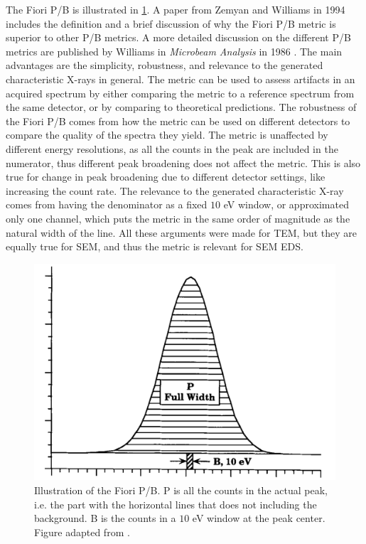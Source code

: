 The Fiori P/B is illustrated in \cref{fig:fiori_pb}.
A paper from Zemyan and Williams in 1994 \cite{zemyan_standard_performance_1994} includes the definition and a brief discussion of why the Fiori P/B metric is superior to other P/B metrics.
A more detailed discussion on the different P/B metrics are published by Williams in \emph{Microbeam Analysis} in 1986 \cite{williams_standard_definitions_1986}.
The main advantages are the simplicity, robustness, and relevance to the generated characteristic X-rays in general.
The metric can be used to assess artifacts in an acquired spectrum by either comparing the metric to a reference spectrum from the same detector, or by comparing to theoretical predictions.
The robustness of the Fiori P/B comes from how the metric can be used on different detectors to compare the quality of the spectra they yield.
The metric is unaffected by different energy resolutions, as all the counts in the peak are included in the numerator, thus different peak broadening does not affect the metric.
This is also true for change in peak broadening due to different detector settings, like increasing the count rate.
The relevance to the generated characteristic X-ray comes from having the denominator as a fixed $10$ eV window, or approximated only one channel, which puts the metric in the same order of magnitude as the natural width of the line.
All these arguments were made for TEM, but they are equally true for SEM, and thus the metric is relevant for SEM EDS.


\begin{figure}[htbp]
    \centering
    \includegraphics[width=0.6\linewidth]{figures/FioriPB_TODO_remake.png}
    \caption{
        Illustration of the Fiori P/B.
        P is all the counts in the actual peak, i.e. the part with the horizontal lines that does not including the background.
        B is the counts in a $10$ eV window at the peak center.
        Figure adapted from \cite{zemyan_standard_performance_1994}.
        }
    \label{fig:fiori_pb}
\end{figure}

